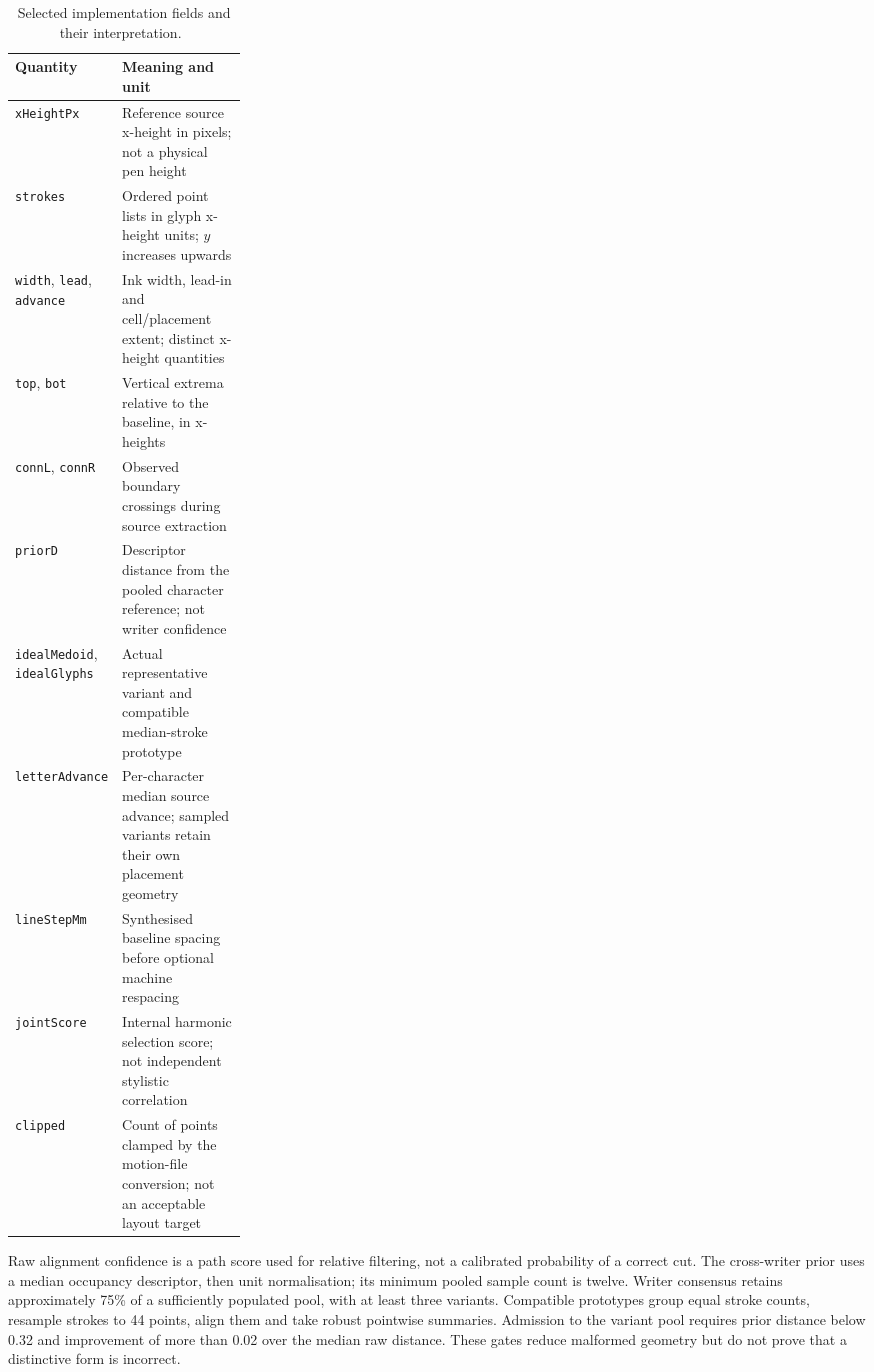 \begin{table}[!htbp]\centering\small
\begin{tabularx}{\linewidth}{|p{0.27\linewidth}|X|}
\hline\textbf{Quantity}&\textbf{Meaning and unit}\\\hline
\texttt{xHeightPx}&Reference source x-height in pixels; not a physical pen height\\\hline
\texttt{strokes}&Ordered point lists in glyph x-height units; $y$ increases upwards\\\hline
\texttt{width}, \texttt{lead}, \texttt{advance}&Ink width, lead-in and cell/placement extent; distinct x-height quantities\\\hline
\texttt{top}, \texttt{bot}&Vertical extrema relative to the baseline, in x-heights\\\hline
\texttt{connL}, \texttt{connR}&Observed boundary crossings during source extraction\\\hline
\texttt{priorD}&Descriptor distance from the pooled character reference; not writer confidence\\\hline
\texttt{idealMedoid}, \texttt{idealGlyphs}&Actual representative variant and compatible median-stroke prototype\\\hline
\texttt{letterAdvance}&Per-character median source advance; sampled variants retain their own placement geometry\\\hline
\texttt{lineStepMm}&Synthesised baseline spacing before optional machine respacing\\\hline
\texttt{jointScore}&Internal harmonic selection score; not independent stylistic correlation\\\hline
\texttt{clipped}&Count of points clamped by the motion-file conversion; not an acceptable layout target\\\hline
\end{tabularx}
\caption{Selected implementation fields and their interpretation.~\cite{brauneevidence2026,braunepipeline2026}}
\label{tab:app-fields}
\end{table}

Raw alignment confidence is a path score used for relative filtering, not a calibrated probability of a correct cut. The cross-writer prior uses a median occupancy descriptor, then unit normalisation; its minimum pooled sample count is twelve. Writer consensus retains approximately 75\% of a sufficiently populated pool, with at least three variants. Compatible prototypes group equal stroke counts, resample strokes to 44 points, align them and take robust pointwise summaries. Admission to the variant pool requires prior distance below 0.32 and improvement of more than 0.02 over the median raw distance. These gates reduce malformed geometry but do not prove that a distinctive form is incorrect.~\cite[train.py; segment.py; style.py]{braunepipeline2026}

